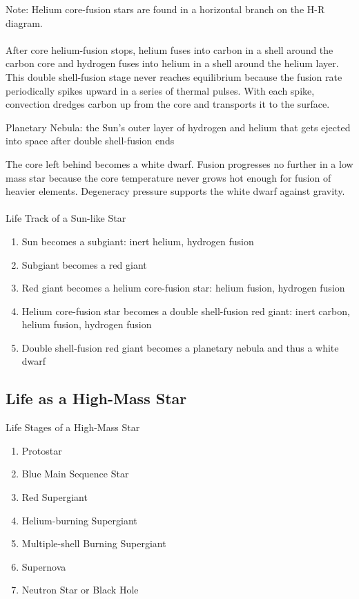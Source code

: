 \documentclass[12pt]{article}
\begin{document}
Note: Helium core-fusion stars are found in a horizontal branch on the H-R diagram. \\~\\
After core helium-fusion stops, helium fuses into carbon in a shell around the carbon core and hydrogen fuses into helium in a shell around the helium layer. This double shell-fusion stage never reaches equilibrium because the fusion rate periodically spikes upward in a series of thermal pulses. With each spike, convection dredges carbon up from the core and transports it to the surface. 
\begin{definition} Planetary Nebula: the Sun's outer layer of hydrogen and helium that gets ejected into space after double shell-fusion ends\end{definition}
The core left behind becomes a white dwarf. Fusion progresses no further in a low mass star because the core temperature never grows hot enough for fusion of heavier elements. Degeneracy pressure supports the white dwarf against gravity. \\~\\
Life Track of a Sun-like Star \begin{enumerate} 
\item Sun becomes a subgiant: inert helium, hydrogen fusion
\item Subgiant becomes a red giant
\item Red giant becomes a helium core-fusion star: helium fusion, hydrogen fusion
\item Helium core-fusion star becomes a double shell-fusion red giant: inert carbon, helium fusion, hydrogen fusion
\item Double shell-fusion red giant becomes a planetary nebula and thus a white dwarf \end{enumerate} 

\subsection{Life as a High-Mass Star} 
Life Stages of a High-Mass Star \begin{enumerate}
\item Protostar
\item Blue Main Sequence Star
\item Red Supergiant 
\item Helium-burning Supergiant
\item Multiple-shell Burning Supergiant
\item Supernova
\item Neutron Star or Black Hole \end{enumerate}
\end{document}
